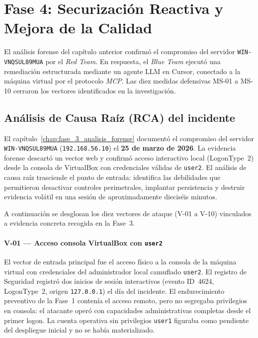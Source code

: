 \chapter[Fase 4: Securización Reactiva]{Fase 4: Securización Reactiva y Mejora de la Calidad}
\label{chap:fase_4_securizacion_reactiva}

\begingroup
\sloppy
\setlength{\emergencystretch}{2.5em}

El análisis forense del capítulo anterior confirmó el compromiso del servidor \texttt{WIN-VNQSUL89MUA} por el \textit{Red Team}. En respuesta, el \textit{Blue Team} ejecutó una remediación estructurada mediante un agente LLM en Cursor, conectado a la máquina virtual por el protocolo \textit{MCP}. Las diez medidas defensivas MS-01 a MS-10 cerraron los vectores identificados en la investigación.

\section[Análisis de Causa Raíz (RCA)]{Análisis de Causa Raíz (RCA) del incidente}
\label{sec:causa_raiz}

El capítulo~\ref{chap:fase_3_analisis_forense} documentó el compromiso del servidor \texttt{WIN-VNQSUL89MUA} (\texttt{192.168.56.10}) el \textbf{25 de marzo de 2026}. La evidencia forense descartó un vector web y confirmó acceso interactivo local (LogonType~2) desde la consola de VirtualBox con credenciales válidas de \texttt{user2}. El análisis de causa raíz trasciende el punto de entrada: identifica las debilidades que permitieron desactivar controles perimetrales, implantar persistencia y destruir evidencia volátil en una sesión de aproximadamente dieciséis minutos.

A continuación se desglosan los diez vectores de ataque (V-01 a V-10) vinculados a evidencia concreta recogida en la Fase~3.

\subsubsection{V-01 --- Acceso consola VirtualBox con \texttt{user2}}
El vector de entrada principal fue el acceso físico a la consola de la máquina virtual con credenciales del administrador local camuflado \texttt{user2}. El registro de Seguridad registró dos inicios de sesión interactivos (evento ID~4624, LogonType~2, origen \texttt{127.0.0.1}) el día del incidente. El endurecimiento preventivo de la Fase~1 contenía el acceso remoto, pero no segregaba privilegios en consola: el atacante operó con capacidades administrativas completas desde el primer logon. La cuenta operativa sin privilegios \texttt{user1} figuraba como pendiente del despliegue inicial y no se había materializado.


